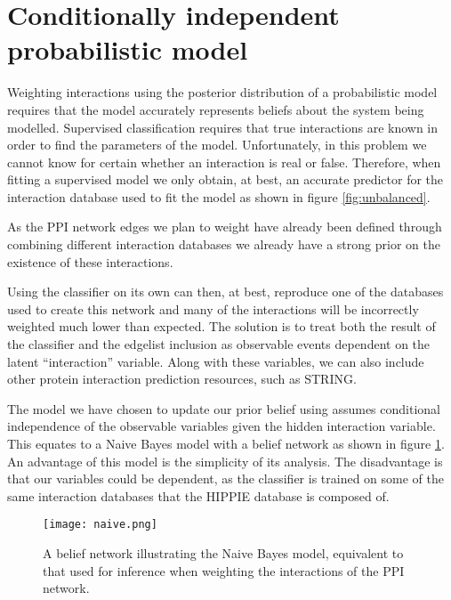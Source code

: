 \section{Conditionally independent probabilistic model}
\label{bayes}

Weighting interactions using the posterior distribution of a probabilistic model requires that the model accurately represents beliefs about the system being modelled.
Supervised classification requires that true interactions are known in order to find the parameters of the model.
Unfortunately, in this problem we cannot know for certain whether an interaction is real or false.
Therefore, when fitting a supervised model we only obtain, at best, an accurate predictor for the interaction database used to fit the model as shown in figure \ref{fig:unbalanced}.

As the \ac{PPI} network edges we plan to weight have already been defined through combining different interaction databases we already have a strong prior on the existence of these interactions.

Using the classifier on its own can then, at best, reproduce one of the databases used to create this network and many of the interactions will be incorrectly weighted much lower than expected.
The solution is to treat both the result of the classifier and the edgelist inclusion as observable events dependent on the latent ``interaction'' variable.
Along with these variables, we can also include other protein interaction prediction resources, such as \ac{STRING}\autocite{von_mering_string:_2005}.

The model we have chosen to update our prior belief using assumes conditional independence of the observable variables given the hidden interaction variable.
This equates to a Naive Bayes model with a belief network as shown in figure \ref{fig:naive}.
An advantage of this model is the simplicity of its analysis.
The disadvantage is that our variables could be dependent, as the classifier is trained on some of the same interaction databases that the \ac{HIPPIE} database is composed of.

\begin{figure}
    \centering
    \texttt{[image: naive.png]}
    \caption{A belief network illustrating the Naive Bayes model, equivalent to that used for inference when weighting the interactions of the \ac{PPI} network.}
    \label{fig:naive}
\end{figure}

